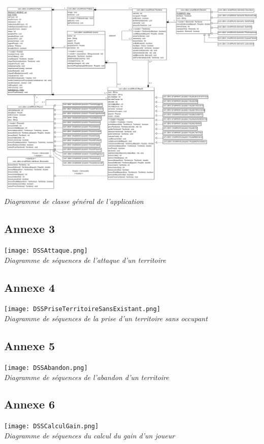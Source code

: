 \documentclass[a4paper, 11pt]{article}
\begin{document}
		\begin{center}
			\includegraphics[width=16cm]{DiagrammeDeClasseAvecSub.png}\\
			\emph{Diagramme de classe général de l'application}		
		\end{center}
		
		\newpage
		
		\subsection*{Annexe 3}
		
		\begin{center}
			\texttt{[image: DSSAttaque.png]}\\
			\emph{Diagramme de séquences de l'attaque d'un territoire}
		\end{center}
		
		\subsection*{Annexe 4}
		
		\begin{center}
			\texttt{[image: DSSPriseTerritoireSansExistant.png]}\\
			\emph{Diagramme de séquences de la prise d'un territoire sans occupant}
		\end{center}

		\subsection*{Annexe 5}
		
		\begin{center}
		\vspace*{3cm}
			\texttt{[image: DSSAbandon.png]}\\
			\emph{Diagramme de séquences de l'abandon d'un territoire}
		\end{center}

		\subsection*{Annexe 6}
		
		\begin{center}
			\texttt{[image: DSSCalculGain.png]}\\
			\emph{Diagramme de séquences du calcul du gain d'un joueur}
		\end{center}
		

		
		




	
\end{document}
